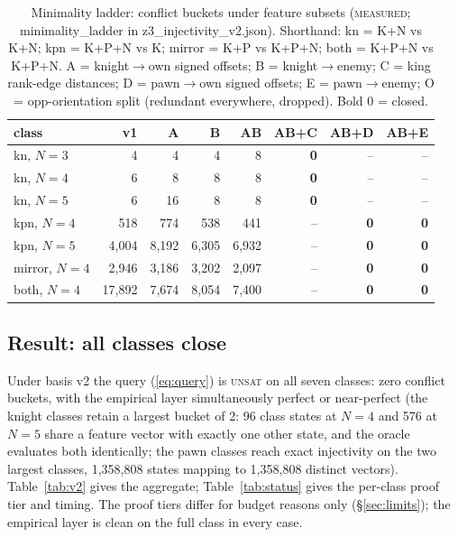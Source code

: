 \documentclass[conference]{IEEEtran}
\newcommand{\tierm}{\textsc{measured}}
\begin{document}
\begin{table}[t]
\caption{Minimality ladder: conflict buckets under feature subsets
(\tierm{}; minimality\_ladder in z3\_injectivity\_v2.json). Shorthand: kn =
K+N vs K+N; kpn = K+P+N vs K; mirror = K+P vs K+P+N; both = K+P+N vs
K+P+N. A = knight$\to$own signed offsets; B = knight$\to$enemy;
C = king rank-edge distances; D = pawn$\to$own signed offsets;
E = pawn$\to$enemy; O = opp-orientation split (redundant everywhere,
dropped). Bold 0 = closed.}
\label{tab:ladder}
\centering
\footnotesize
\setlength{\tabcolsep}{3pt}
\begin{tabular}{lrrrrrrr}
\toprule
class & v1 & A & B & AB & AB+C & AB+D & AB+E \\
\midrule
kn, $N{=}3$ & 4 & 4 & 4 & 8 & \textbf{0} & -- & -- \\
kn, $N{=}4$ & 6 & 8 & 8 & 8 & \textbf{0} & -- & -- \\
kn, $N{=}5$ & 6 & 16 & 8 & 8 & \textbf{0} & -- & -- \\
kpn, $N{=}4$ & 518 & 774 & 538 & 441 & -- & \textbf{0} & \textbf{0} \\
kpn, $N{=}5$ & 4{,}004 & 8{,}192 & 6{,}305 & 6{,}932 & -- & \textbf{0} & \textbf{0} \\
mirror, $N{=}4$ & 2{,}946 & 3{,}186 & 3{,}202 & 2{,}097 & -- & \textbf{0} & \textbf{0} \\
both, $N{=}4$ & 17{,}892 & 7{,}674 & 8{,}054 & 7{,}400 & -- & \textbf{0} & \textbf{0} \\
\bottomrule
\end{tabular}
\end{table}

\subsection{Result: all classes close}
Under basis v2 the query (\ref{eq:query}) is \textsc{unsat} on all seven
classes: zero conflict buckets, with the empirical layer simultaneously
perfect or near-perfect (the knight classes retain a largest bucket of 2:
96 class states at $N{=}4$ and 576 at $N{=}5$ share a feature vector with
exactly one other state, and the oracle evaluates both identically; the
pawn classes reach exact injectivity on the two
largest classes, 1{,}358{,}808 states mapping to 1{,}358{,}808 distinct
vectors). Table~\ref{tab:v2} gives the aggregate; Table~\ref{tab:status}
gives the per-class proof tier and timing. The proof tiers differ for
budget reasons only (\S\ref{sec:limits}); the empirical layer is clean on
the full class in every case.
\end{document}
